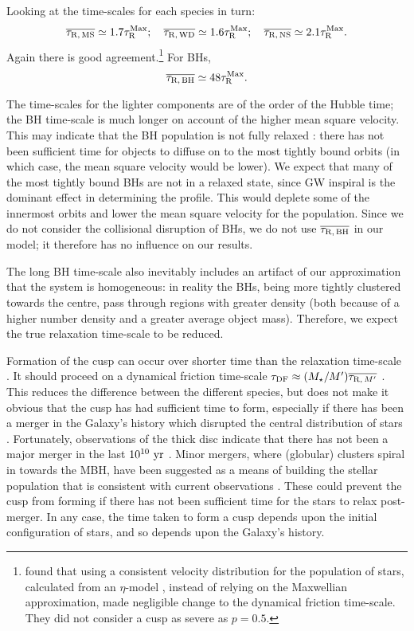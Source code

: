Looking at the time-scales for each species in turn:
\begin{equation}
\overline{\tau_\mathrm{R,\,MS}} \simeq 1.7 \tau_\mathrm{R}^\mathrm{Max};\quad \overline{\tau_\mathrm{R,\,WD}} \simeq 1.6 \tau_\mathrm{R}^\mathrm{Max};\quad \overline{\tau_\mathrm{R,\,NS}} \simeq 2.1 \tau_\mathrm{R}^\mathrm{Max}.
\end{equation}
Again there is good agreement.\footnote{\citet*{Freitag2006} found that using a consistent velocity distribution for the population of stars, calculated from an $\eta$-model \citep{Tremaine1994}, instead of relying on the Maxwellian approximation, made negligible change to the dynamical friction time-scale. They did not consider a cusp as severe as $p = 0.5$.} For BHs,
\begin{equation}
\overline{\tau_\mathrm{R,\,BH}} \simeq 48 \tau_\mathrm{R}^\mathrm{Max}.
\end{equation}

The time-scales for the lighter components are of the order of the Hubble time; the BH time-scale is much longer on account of the higher mean square velocity. This may indicate that the BH population is not fully relaxed \citep[cf.][]{Antonini2011}: there has not been sufficient time for objects to diffuse on to the most tightly bound orbits (in which case, the mean square velocity would be lower). We expect that many of the most tightly bound BHs are not in a relaxed state, since GW inspiral is the dominant effect in determining the profile. This would deplete some of the innermost orbits and lower the mean square velocity for the population. Since we do not consider the collisional disruption of BHs, we do not use $\overline{\tau_\mathrm{R,\,BH}}$ in our model; it therefore has no influence on our results.

The long BH time-scale also inevitably includes an artifact of our approximation that the system is homogeneous: in reality the BHs, being more tightly clustered towards the centre, pass through regions with greater density (both because of a higher number density and a greater average object mass). Therefore, we expect the true relaxation time-scale to be reduced. 

Formation of the cusp can occur over shorter time than the relaxation time-scale \citep{Bar-Or2012}. It should proceed on a dynamical friction time-scale $\tau_\mathrm{DF} \approx (M_\star/M')\overline{\tau_{\mathrm{R},\,M'}}$ \citep[section 3.4]{Spitzer1987Jr}. This reduces the difference between the different species, but does not make it obvious that the cusp has had sufficient time to form, especially if there has been a merger in the Galaxy's history which disrupted the central distribution of stars \citep{Gualandris2012}. Fortunately, observations of the thick disc indicate that there has not been a major merger in the last $10^{10}~\mathrm{yr}$ \citep{Wyse2008}. Minor mergers, where (globular) clusters spiral in towards the MBH, have been suggested as a means of building the stellar population that is consistent with current observations \citep{Antonini2011a,Antonini2013}. These could prevent the cusp from forming if there has not been sufficient time for the stars to relax post-merger. In any case, the time taken to form a cusp depends upon the initial configuration of stars, and so depends upon the Galaxy's history.

